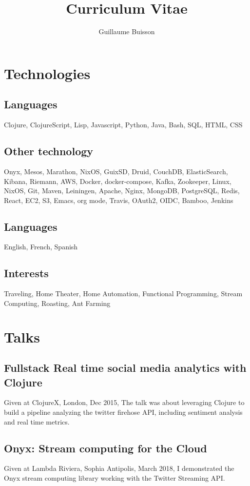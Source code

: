 \documentclass{article}
\title{Curriculum Vitae}
\author{Guillaume Buisson}
\date{}
\begin{document}
\maketitle
\section*{Technologies}
\subsection*{Languages}
Clojure, ClojureScript, Lisp, Javascript, Python, Java, Bash, SQL, HTML, CSS

\subsection*{Other technology}
Onyx, Mesos, Marathon, NixOS, GuixSD, Druid, CouchDB, ElasticSearch, Kibana, Riemann, AWS, Docker, docker-compose, Kafka, Zookeeper, Linux, NixOS, Git, Maven, Leiningen, Apache, Nginx, MongoDB, PostgreSQL, Redis, React, EC2, S3, Emacs, org mode, Travis, OAuth2, OIDC, Bamboo, Jenkins

\subsection*{Languages}
English, French, Spanish

\subsection*{Interests}
Traveling, Home Theater, Home Automation, Functional Programming, Stream Computing, Roasting, Ant Farming

\section*{Talks}
\subsection*{Fullstack Real time social media analytics with Clojure}
Given at ClojureX, London, Dec 2015, The talk was about
leveraging Clojure to build a pipeline analyzing the twitter firehose API,
including sentiment analysis and real time metrics.

\subsection*{Onyx: Stream computing for the Cloud}
Given at Lambda Riviera, Sophia Antipolis, March 2018, I demonstrated the Onyx stream computing
library working with the Twitter Streaming API.
\end{document}
